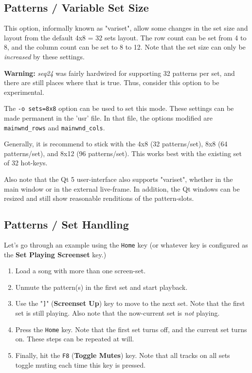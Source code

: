 \subsection{Patterns / Variable Set Size}
\label{subsec:patterns_panel_variset}

   This option, informally known as "variset", allow some changes in
   the set size and layout from the default 4x8 = 32 sets layout.
   The row count can be set from 4 to 8, and the column count can be set to 8
   to 12.  Note that the set size can only be \textsl{increased} by these
   settings.

   \textbf{Warning:}
   \textsl{seq24} was fairly hardwired for supporting 32 patterns per
   set, and there are still places where that is true.  Thus,
   consider this option to be experimental.

   The \texttt{-o sets=8x8} option can be used to set this mode.
   These settings can be made permanent in the 'usr' file.
   In that file, the options modified are \texttt{mainwnd\_rows} and
   \texttt{mainwnd\_cols}.

   Generally, it is recommend to stick with the 4x8 (32 patterns/set),
   8x8 (64 patterns/set), and 8x12 (96 patterns/set).  This works best with the
   existing set of 32 hot-keys.

   Also note that the Qt 5 user-interface also supports "variset", whether in
   the main window or in the external live-frame.  In addition, the Qt windows
   can be resized and still show reasonable renditions of the pattern-slots.

\subsection{Patterns / Set Handling}
\label{subsec:patterns_panel_set_handling}

   Let's go through an example using the \texttt{Home} key (or whatever key is
   configured as the \textbf{Set Playing Screenset} key.)

   \begin{enumerate}
      \item Load a song with more than one screen-set.
      \item Unmute the pattern(s) in the first set and start playback.
      \item Use the "\texttt{]}" (\textbf{Screenset Up}) key to move to the next
         set.  Note that the first set is still playing.  Also note that the
         now-current set is \textsl{not} playing.
      \item Press the \texttt{Home} key.
         Note that the first set turns off, and the current set turns on.
         These steps can be repeated at will.
      \item Finally, hit the \texttt{F8} (\textbf{Toggle Mutes}) key.
         Note that all tracks on all sets toggle muting each time this key is
         pressed.
   \end{enumerate}

